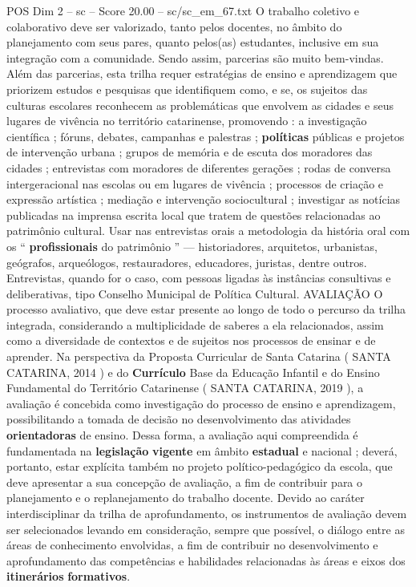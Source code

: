 \begin{textsample}{POS Dim 2 – sc – Score 20.00 – sc/sc\_em\_67.txt}
O trabalho coletivo e colaborativo deve ser valorizado, tanto pelos docentes, no âmbito do planejamento com seus pares, quanto pelos(as) estudantes, inclusive em sua integração com a comunidade.
Sendo assim, parcerias são muito bem-vindas.
Além das parcerias, esta trilha requer estratégias de ensino e aprendizagem que priorizem estudos e pesquisas que identifiquem como, e se, os sujeitos das culturas escolares reconhecem as problemáticas que envolvem as cidades e seus lugares de vivência no território catarinense, promovendo : a investigação científica ; fóruns, debates, campanhas e palestras ; \textbf{políticas} públicas e projetos de intervenção urbana ; grupos de memória e de escuta dos moradores das cidades ; entrevistas com moradores de diferentes gerações ; rodas de conversa intergeracional nas escolas ou em lugares de vivência ; processos de criação e expressão artística ; mediação e intervenção sociocultural ; investigar as notícias publicadas na imprensa escrita local que tratem de questões relacionadas ao patrimônio cultural.
Usar nas entrevistas orais a metodologia da história oral com os “ \textbf{profissionais} do patrimônio ” — historiadores, arquitetos, urbanistas, geógrafos, arqueólogos, restauradores, educadores, juristas, dentre outros.
Entrevistas, quando for o caso, com pessoas ligadas às instâncias consultivas e deliberativas, tipo Conselho Municipal de Política Cultural.
AVALIAÇÃO O processo avaliativo, que deve estar presente ao longo de todo o percurso da trilha integrada, considerando a multiplicidade de saberes a ela relacionados, assim como a diversidade de contextos e de sujeitos nos processos de ensinar e de aprender.
Na perspectiva da Proposta Curricular de Santa Catarina ( SANTA CATARINA, 2014 ) e do \textbf{Currículo} Base da Educação Infantil e do Ensino Fundamental do Território Catarinense ( SANTA CATARINA, 2019 ), a avaliação é concebida como investigação do processo de ensino e aprendizagem, possibilitando a tomada de decisão no desenvolvimento das atividades \textbf{orientadoras} de ensino.
Dessa forma, a avaliação aqui compreendida é fundamentada na \textbf{legislação} \textbf{vigente} em âmbito \textbf{estadual} e nacional ; deverá, portanto, estar explícita também no projeto político-pedagógico da escola, que deve apresentar a sua concepção de avaliação, a fim de contribuir para o planejamento e o replanejamento do trabalho docente.
Devido ao caráter interdisciplinar da trilha de aprofundamento, os instrumentos de avaliação devem ser selecionados levando em consideração, sempre que possível, o diálogo entre as áreas de conhecimento envolvidas, a fim de contribuir no desenvolvimento e aprofundamento das competências e habilidades relacionadas às áreas e eixos dos \textbf{itinerários} \textbf{formativos}.

\end{textsample}

